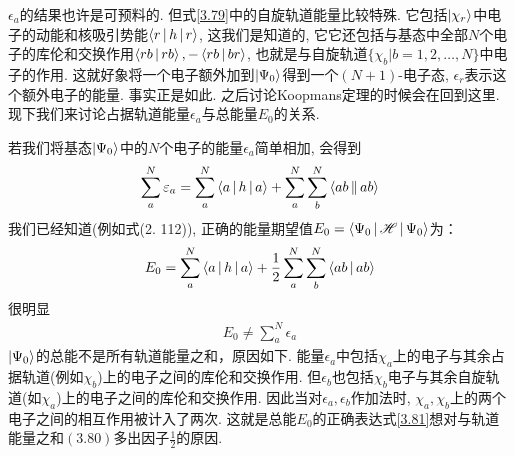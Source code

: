 $\epsilon_a$的结果也许是可预料的. 但式\eqref{3.79}中的自旋轨道能量比较特殊. 
它包括$\Ket{\chi_r}$中电子的动能和核吸引势能$\Braket{r|h|r}$, 这我们是知道的, 
它它还包括与\hft 基态中全部$N$个电子的库伦和交换作用$\Braket{rb|rb},-\Braket{rb|br}$, 也就是与自旋轨道$\{\chi_b|b=1,2,\ldots,N\}$中电子的作用. 
这就好象将一个电子额外加到$\Ket{\Psi_0}$得到一个$(N+1)$-电子态, $\epsilon_r$表示这个额外电子的能量. 
事实正是如此. 之后讨论Koopmans定理的时候会在回到这里. 
现下我们来讨论占据轨道能量$\epsilon_a$与总能量$E_0$的关系.

若我们将基态$\Ket{\Psi_0}$中的$N$个电子的能量$\epsilon_a$简单相加, 
会得到
\begin{align}
	\sum_{a}^{N}\varepsilon_a = \sum_a^N\Braket{a|h|a} + \sum_a^N\sum_b^N\Braket{ab||ab}
\end{align}
我们已经知道(例如式(2.
112)), 
正确的能量期望值$E_0 = \Braket{\Psi_0|\mathscr{H}|\Psi_0}$为：
\begin{align}
	\label{3.81}
	E_0 = \sum_a^N\Braket{a|h|a} + \frac{1}{2}\sum_a^N\sum_b^N\Braket{ab|ab}
\end{align}
很明显
\begin{align}
	E_0 \neq \sum_a^N \epsilon_a
\end{align}
$\Ket{\Psi_0}$的总能不是所有轨道能量之和，原因如下. 
能量$\epsilon_a$中包括$\chi_a$上的电子与其余占据轨道(例如$\chi_b$)上的电子之间的库伦和交换作用. 
但$\epsilon_b$也包括$\chi_b$电子与其余自旋轨道(如$\chi_a$)上的电子之间的库伦和交换作用. 
因此当对$\epsilon_a,\epsilon_b$作加法时, $\chi_a,\chi_b$上的两个电子之间的相互作用被计入了两次. 这就是总能$E_0$的正确表达式\eqref{3.81}想对与轨道能量之和$(3.80)$多出因子$\frac{1}{2}$的原因.

